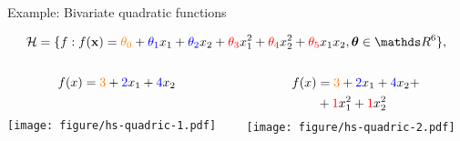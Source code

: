\documentclass[11pt,compress,t,notes=noshow, xcolor=table]{beamer}
\begin{document}
\begin{vbframe}{Example: Bivariate quadratic functions}

\begin{equation*}
    \Hspace = \{f: \fx =  
    \textcolor{orange}{\theta_0} + \textcolor{blue}{\theta_1} x_1 + 
    \textcolor{blue}{\theta_2} x_2 + \textcolor{red}{\theta_3} x_1^2 + 
    \textcolor{red}{\theta_4} x_2^2 + \textcolor{red}{\theta_5} x_1 x_2, 
    \thetav \in \R^6\},
\end{equation*}


\vspace*{-\baselineskip}

\begin{columns}

  \tiny

  \begin{column}{0.33\textwidth}
    \begin{center}
      \begin{equation*}
        \begin{split}
          f(x) &= \textcolor{orange}{3} + \textcolor{blue}{2} x_1 + 
          \textcolor{blue}{4} x_2 \\
          \textcolor{white}{x} 
        \end{split}
      \end{equation*}
      \vspace*{-1.5\baselineskip}
      \texttt{[image: figure/hs-quadric-1.pdf]}
    \end{center}
  \end{column}
  
  \begin{column}{0.33\textwidth}
    \begin{center}
      \begin{equation*}
        \begin{split}
          f(x) &= \textcolor{orange}{3} + \textcolor{blue}{2} x_1 + 
          \textcolor{blue}{4} x_2 + \\
          &+ \textcolor{red}{1} x_1^2 + \textcolor{red}{1} x_2^2
        \end{split}
      \end{equation*}
      \vspace*{-1.5\baselineskip}
      \texttt{[image: figure/hs-quadric-2.pdf]}
    \end{center}
  \end{column}
  

\end{columns}
\end{vbframe}
\end{document}

